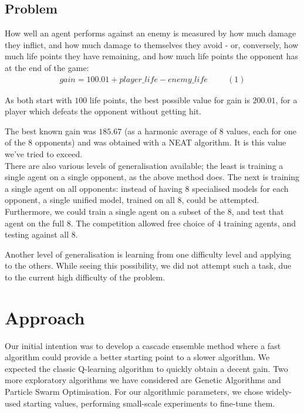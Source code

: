 \documentclass[conference]{IEEEtran}
\begin{document}
    \subsection{Problem}\label{subsec:problem}
    How well an agent performs against an enemy is measured by how much damage they inflict, and how much damage to themselves they avoid - or, conversely, how much life points they have remaining, and how much life points the opponent has at the end of the game:
    \vspace{-0.1cm}
    \begin{gather*}
      gain = 100.01 + player\_life - enemy\_life \hspace{1cm} (1)
    \end{gather*}

    As both start with $100$ life points, the best possible value for gain is $200.01$, for a player which defeats the opponent without getting hit.

    The best known gain was $185.67$ (as a harmonic average of $8$ values, each for one of the $8$ opponents)
    \cite{evoman} and was obtained with a NEAT\cite{neat} algorithm. It is this value we've tried to exceed.\\

    There are also various levels of generalisation available; the least is training a single agent on a single opponent, as the above method does. The next is training a single agent on all opponents: instead of having $8$ specialised models for each opponent, a single unified model, trained on all $8$, could be attempted. Furthermore, we could train a single agent on a subset of the $8$, and test that agent on the full $8$. The competition\cite{evoman_competition} allowed free choice of $4$ training agents, and testing against all $8$.

    Another level of generalisation is learning from one difficulty level and applying to the others. While seeing this possibility, we did not attempt such a task, due to the current high difficulty of the problem.
    
    \section{Approach}\label{sec:approach}
    Our initial intention was to develop a cascade ensemble method where a fast algorithm could provide a better starting point to a slower algorithm.
    We expected the classic Q-learning\cite{q_learning} algorithm to quickly obtain a decent gain. Two more exploratory algorithms we have considered are Genetic Algorithms\cite{genetic_algorithm} and Particle Swarm Optimisation\cite{pso}. For our algorithmic parameters, we chose widely-used starting values, performing small-scale experiments to fine-tune them.
    
\end{document}
